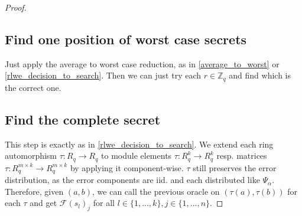 \documentclass{report}
\newcommand{\Z}{\mathbb{Z}}
\begin{document}
\begin{proof}
\subsection{Find one position of worst case secrets}
Just apply the average to worst case reduction, as in \ref{average_to_worst} or \ref{rlwe_decision_to_search}. Then we can just try each $r \in \Z_q$ and find which is the correct one.

\subsection{Find the complete secret}
This step is exactly as in \ref{rlwe_decision_to_search}. We extend each ring automorphism $\tau: R_q \to R_q$ to module elements $\tau: R_q^k \to R_q^k$ resp. matrices $\tau: R_q^{m \times k} \to R_q^{m \times k}$ by applying it component-wise. $\tau$ still preserves the error distribution, as the error components are iid. and each distributed like $\Psi_\alpha$. Therefore, given $(a, b)$, we can call the previous oracle on $(\tau(a), \tau(b))$ for each $\tau$ and get $\mathcal{F}(s_l)_j$ for all $l \in \{ 1, ..., k \}, j \in \{ 1, ..., n \}$. \qedhere
\end{proof}
\end{document}
